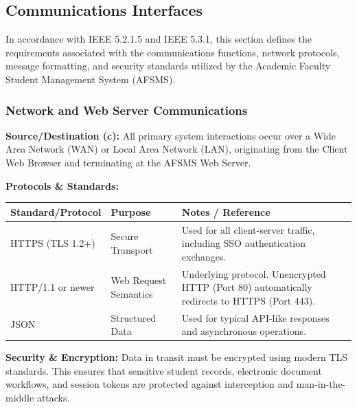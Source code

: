\documentclass[11pt, a4paper]{article}
\begin{document}
\subsection{Communications Interfaces}
In accordance with IEEE 5.2.1.5 and IEEE 5.3.1, this section defines the requirements associated with the communications functions, network protocols, message formatting, and security standards utilized by the Academic Faculty Student Management System (AFSMS).

\subsubsection{Network and Web Server Communications}
\textbf{Source/Destination (c):}
All primary system interactions occur over a Wide Area Network (WAN) or Local Area Network (LAN), originating from the Client Web Browser and terminating at the AFSMS Web Server.

\textbf{Protocols \& Standards:}
\begin{table}[H]
\begin{tabularx}{\textwidth}{>{\raggedright\arraybackslash}p{3.5cm} >{\raggedright\arraybackslash}p{3cm} >{\raggedright\arraybackslash}X}
\toprule
\textbf{Standard/Protocol} & \textbf{Purpose} & \textbf{Notes / Reference} \\
\midrule
HTTPS (TLS 1.2+) & Secure Transport & Used for all client-server traffic, including SSO authentication exchanges. \\
\midrule
HTTP/1.1 or newer & Web Request Semantics & Underlying protocol. Unencrypted HTTP (Port 80) automatically redirects to HTTPS (Port 443). \\
\midrule
JSON & Structured Data & Used for typical API-like responses and asynchronous operations. \\
\bottomrule
\end{tabularx}
\end{table}

\textbf{Security \& Encryption:}
Data in transit must be encrypted using modern TLS standards. This ensures that sensitive student records, electronic document workflows, and session tokens are protected against interception and man-in-the-middle attacks.
\end{document}

